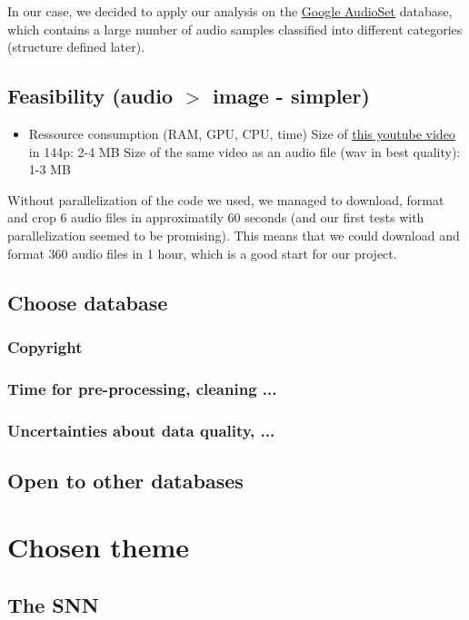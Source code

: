 \documentclass[11pt]{article}
\begin{document}
In our case, we decided to apply our analysis on the \hyperref[item:google-audioset]{Google AudioSet} database, which contains a large number of audio samples classified into different categories (structure defined later).
\subsection{Feasibility (audio $>$ image - simpler)}

\begin{itemize}
  \item Ressource consumption (RAM, GPU, CPU, time)
        \subitem Size of \href{https://www.youtube.com/watch?v=dQw4w9WgXcQ}{this youtube video} in 144p: 2-4 MB
        \subitem Size of the same video as an audio file (wav in best quality): 1-3 MB
\end{itemize}

Without parallelization of the code we used, we managed to download, format and crop 6 audio files in approximatily 60 seconds (and our first tests with parallelization seemed to be promising). This means that we could download and format 360 audio files in 1 hour, which is a good start for our project.


\subsection{Choose database}
\subsubsection{Copyright}
\subsubsection{Time for pre-processing, cleaning ...}
\subsubsection{Uncertainties about data quality, ...}
\subsection{Open to other databases}


\section{Chosen theme}
\subsection{The SNN}
\end{document}
